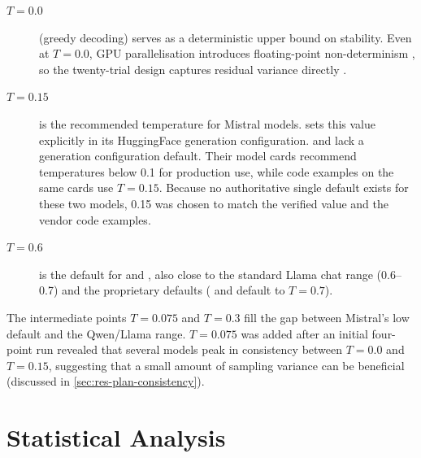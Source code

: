 \begin{description}
  \item[$T = 0.0$] (greedy decoding) serves as a deterministic upper
    bound on stability. Even at $T = 0.0$, GPU parallelisation introduces
    floating-point non-determinism \parencite{HITR7PL4}, so the
    twenty-trial design captures residual variance directly
    \parencite{WA4QD3UE}.
  \item[$T = 0.15$] is the recommended temperature for Mistral models.
     sets this value explicitly in its
    HuggingFace generation configuration. 
    and  lack a generation configuration
    default. Their model cards recommend temperatures below 0.1 for
    production use, while code examples on the same cards use
    $T = 0.15$. Because no authoritative single default exists for these
    two models, 0.15 was chosen to match the verified
     value and the vendor code examples.
  \item[$T = 0.6$] is the default for  and
    , also close to the standard Llama chat range
    (0.6--0.7) and the proprietary defaults ( and
     default to $T = 0.7$).
\end{description}

The intermediate points $T = 0.075$ and $T = 0.3$ fill the gap between
Mistral's low default and the Qwen/Llama range. $T = 0.075$ was added
after an initial four-point run revealed that several models peak in
consistency between $T = 0.0$ and $T = 0.15$, suggesting that a small
amount of sampling variance can be beneficial (discussed in
\autoref{sec:res-plan-consistency}).


\section{Statistical Analysis}
\label{sec:meth-stats}

